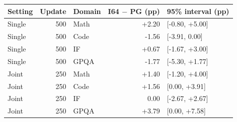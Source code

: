 \begin{tabular}{lrlrl}
\toprule
Setting & Update & Domain & I64 $-$ PG (pp) & 95\% interval (pp) \\
\midrule
Single & 500 & Math & +2.20 & [-0.80, +5.00] \\
Single & 500 & Code & -1.56 & [-3.91, 0.00] \\
Single & 500 & IF & +0.67 & [-1.67, +3.00] \\
Single & 500 & GPQA & -1.77 & [-5.30, +1.77] \\
\midrule
Joint & 250 & Math & +1.40 & [-1.20, +4.00] \\
Joint & 250 & Code & +1.56 & [0.00, +3.91] \\
Joint & 250 & IF & 0.00 & [-2.67, +2.67] \\
Joint & 250 & GPQA & +3.79 & [0.00, +7.58] \\
\bottomrule
\end{tabular}

